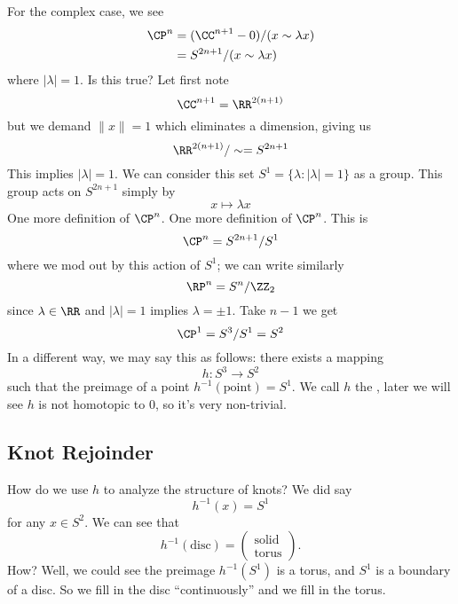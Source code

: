 For the complex case, we see
\begin{equation}
\begin{split}
\CP^n &= (\CC^{n+1}-0)/(x\sim\lambda x)\\
&= S^{2n+1}/(x\sim\lambda x)
\end{split}
\end{equation}
where $|\lambda|=1$. Is this true? Let first note
\begin{equation}
\CC^{n+1}=\RR^{2(n+1)}
\end{equation}
but we demand $\|x\|=1$ which eliminates a dimension, giving us
\begin{equation}
\RR^{2(n+1)}/\sim = S^{2n+1}
\end{equation}
This implies $|\lambda|=1$. We can consider this set $S^{1}=\{\lambda :
|\lambda|=1\}$ as a group. This group acts on $S^{2n+1}$ simply
by
\begin{equation}
x\mapsto\lambda x
\end{equation}
%
One more definition of $\CP^n$. One more definition of
$\CP^n$. This is
\begin{equation}
\CP^n=S^{2n+1}/S^{1}
\end{equation}
where we mod out by this action of $S^1$; we can write similarly
\begin{equation}
\RP^n=S^n/\ZZ_2
\end{equation}
since $\lambda\in\RR$ and $|\lambda|=1$ implies
$\lambda=\pm1$. Take $n-1$ we get
\begin{equation}
\CP^1=S^3/S^1=S^2
\end{equation}
In a different way, we may say this as follows: there exists a
mapping
\begin{equation}
h\colon S^3\to S^2
\end{equation}
such that the preimage of a point $h^{-1}(\mbox{point})=S^1$. We
call $h$ the , later we will see
$h$ is not homotopic to 0, so it's very non-trivial.
%

\subsection{Knot Rejoinder}
How do we use $h$ to analyze the structure of knots? We did say
\begin{equation}
h^{-1}(x)=S^1
\end{equation}
for any $x\in S^2$. We can see that
\begin{equation}
h^{-1}(\mbox{disc})=\begin{pmatrix}\mbox{solid}\\\mbox{torus}
\end{pmatrix}.
\end{equation}
How? Well, we could see the preimage $h^{-1}(S^{1})$ is a torus,
and $S^1$ is a boundary of a disc. So we fill in the disc
``continuously'' and we fill in the torus. 


